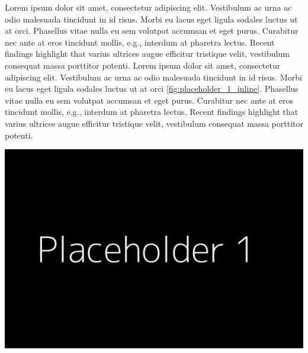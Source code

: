 \documentclass[11pt]{article}
\begin{document}
\begin{enumerate}[wide, labelindent=0pt]
\begin{enumerate}[wide, labelindent=0pt]
        \noindent
        \begin{minipage}[c]{0.75\textwidth}\setlength{\parindent}{1.5em}
        Lorem ipsum dolor sit amet, consectetur adipiscing elit.
        Vestibulum ac urna ac odio malesuada tincidunt in id risus.
        Morbi eu lacus eget ligula sodales luctus ut at orci.
        Phasellus vitae nulla eu sem volutpat accumsan et eget purus. Curabitur nec ante at eros tincidunt mollis, e.g., interdum at pharetra lectus.
        Recent findings highlight that varius ultrices augue efficitur tristique velit, vestibulum consequat massa porttitor potenti.
        Lorem ipsum dolor sit amet, consectetur adipiscing elit.
        Vestibulum ac urna ac odio malesuada tincidunt in id risus.
        Morbi eu lacus eget ligula sodales luctus ut at orci \ref{fig:placeholder_1_inline}.
        Phasellus vitae nulla eu sem volutpat accumsan et eget purus. Curabitur nec ante at eros tincidunt mollis, e.g., interdum at pharetra lectus.
        Recent findings highlight that varius ultrices augue efficitur tristique velit, vestibulum consequat massa porttitor potenti.
        \end{minipage}
        \begin{minipage}[c]{0.18\textwidth}
            \vspace{-24pt}
            \captionsetup{skip=0pt,labelfont=bf}
            \includegraphics[scale=0.14]{images/Placeholder1.png}
            \label{fig:placeholder_1_inline}
        \end{minipage}\\
        

\end{enumerate}
\end{enumerate}
\end{document}
